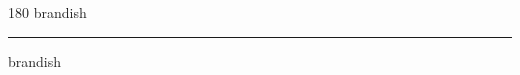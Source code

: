 
\begin{frame}
\begin{center}
\begin{turn}{180}
{\fontsize{2.5cm}{1em}\selectfont brandish}
\end{turn}
\vspace{1em}\par  
\hrule
\vspace{1em}\par  
{\fontsize{2.5cm}{1em}\selectfont brandish}
\end{center}
\end{frame}
